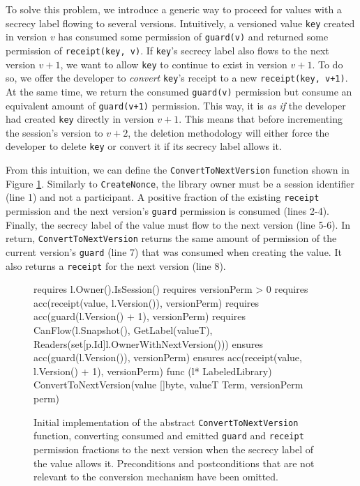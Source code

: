 To solve this problem, we introduce a generic way to proceed for values with a secrecy label flowing to several versions.
Intuitively, a versioned value \texttt{key} created in version $v$ has consumed some permission of \texttt{guard(v)} and returned some permission of \texttt{receipt(key, v)}.
If \texttt{key}'s secrecy label also flows to the next version $v+1$, we want to allow \texttt{key} to continue to exist in version $v+1$.
To do so, we offer the developer to \emph{convert} \texttt{key}'s receipt to a new \texttt{receipt(key, v+1)}. At the same time, we return the consumed \texttt{guard(v)} permission but consume an equivalent amount of \texttt{guard(v+1)} permission.
This way, it is \emph{as if} the developer had created \texttt{key} directly in version $v+1$.
This means that before incrementing the session's version to $v+2$, the deletion methodology will either force the developer to delete \texttt{key} or convert it if its secrecy label allows it.

From this intuition, we can define the \texttt{ConvertToNextVersion} function shown in Figure \ref{lst:convert-to-next-version}.
Similarly to \texttt{CreateNonce}, the library owner must be a session identifier (line 1) and not a participant. A positive fraction of the existing \texttt{receipt} permission and the next version's \texttt{guard} permission is consumed (lines 2-4). Finally, the secrecy label of the value must flow to the next version (line 5-6).
In return, \texttt{ConvertToNextVersion} returns the same amount of permission of the current version's \texttt{guard} (line 7) that was consumed when creating the value. It also returns a \texttt{receipt} for the next version (line 8).

\begin{figure}
    \begin{gobra}
requires l.Owner().IsSession()
requires versionPerm > 0
requires acc(receipt(value, l.Version()), versionPerm)
requires acc(guard(l.Version() + 1), versionPerm)
requires CanFlow(l.Snapshot(), GetLabel(valueT),
                        Readers(set[p.Id]{l.OwnerWithNextVersion()}))
ensures  acc(guard(l.Version()), versionPerm)
ensures  acc(receipt(value, l.Version() + 1), versionPerm)
func (l* LabeledLibrary) ConvertToNextVersion(value []byte,
                                       valueT Term, versionPerm perm)
    \end{gobra}
    \caption{Initial implementation of the abstract \texttt{ConvertToNextVersion} function, converting consumed and emitted \texttt{guard} and \texttt{receipt} permission fractions to the next version when the secrecy label of the value allows it. Preconditions and postconditions that are not relevant to the conversion mechanism have been omitted.}
    \label{lst:convert-to-next-version}
\end{figure}

